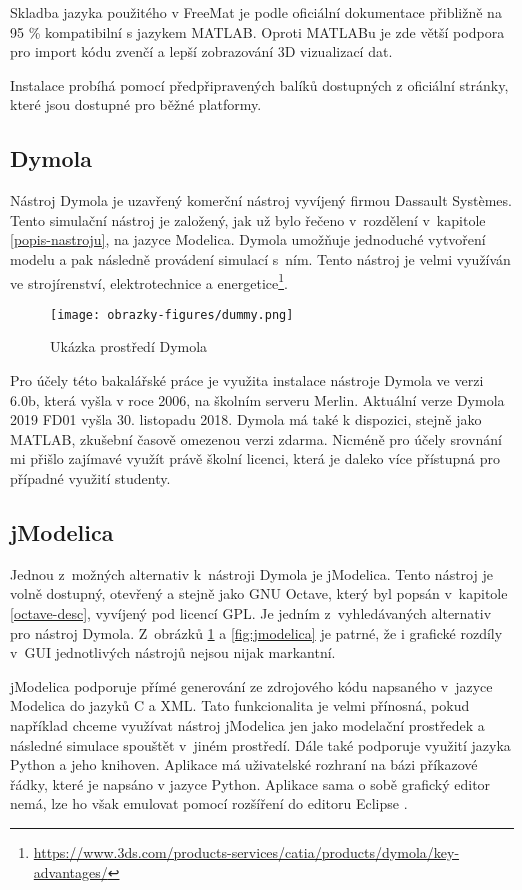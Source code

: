 Skladba jazyka použitého v FreeMat je podle oficiální dokumentace přibližně na 95 \% kompatibilní s jazykem MATLAB. Oproti MATLABu je zde větší podpora pro import kódu zvenčí a lepší zobrazování 3D vizualizací dat\cite{FreeMat}.

Instalace probíhá pomocí předpřipravených balíků dostupných z oficiální stránky, které jsou dostupné pro běžné platformy.



\subsection{Dymola}
\label{dymola-desc}

Nástroj Dymola je uzavřený komerční nástroj vyvíjený firmou Dassault Systèmes. Tento simulační nástroj je založený, jak už bylo řečeno v~rozdělení v~kapitole \ref{popis-nastroju}, na jazyce Modelica. Dymola umožňuje jednoduché vytvoření modelu a pak následně provádení simulací s~ním. Tento nástroj je velmi využíván ve strojírenství, elektrotechnice a energetice\footnote{\url{https://www.3ds.com/products-services/catia/products/dymola/key-advantages/}}.

\begin{figure}[ht]
    \centering
    \texttt{[image: obrazky-figures/dummy.png]}
    \caption{Ukázka prostředí Dymola}
    \label{fig:dymola}
\end{figure}

Pro účely této bakalářské práce je využita instalace nástroje Dymola ve verzi 6.0b, která vyšla v roce 2006, na školním serveru Merlin. Aktuální verze Dymola 2019 FD01 vyšla 30. listopadu 2018. Dymola má také k dispozici, stejně jako MATLAB, zkušební časově omezenou verzi zdarma. Nicméně pro účely srovnání mi přišlo zajímavé využít právě školní licenci, která je daleko více přístupná pro případné využití studenty.


\subsection{jModelica}
Jednou z~možných alternativ k~nástroji Dymola je jModelica. Tento nástroj je volně dostupný, otevřený a stejně jako GNU Octave, který byl popsán v~kapitole \ref{octave-desc}, vyvíjený pod licencí GPL. Je jedním z~vyhledávaných alternativ pro nástroj Dymola. Z~obrázků \ref{fig:dymola} a \ref{fig:jmodelica} je patrné, že i grafické rozdíly v~GUI jednotlivých nástrojů nejsou nijak markantní.

jModelica podporuje přímé generování ze zdrojového kódu napsaného v~jazyce Modelica do jazyků C a XML. Tato funkcionalita je velmi přínosná, pokud například chceme využívat nástroj jModelica jen jako modelační prostředek a následné simulace spouštět v~jiném prostředí. Dále také podporuje využití jazyka Python a jeho knihoven. Aplikace má uživatelské rozhraní na bázi příkazové řádky, které je napsáno v jazyce Python. Aplikace sama o sobě grafický editor nemá, lze ho však emulovat pomocí rozšíření do editoru Eclipse \cite{modelica-example}.

